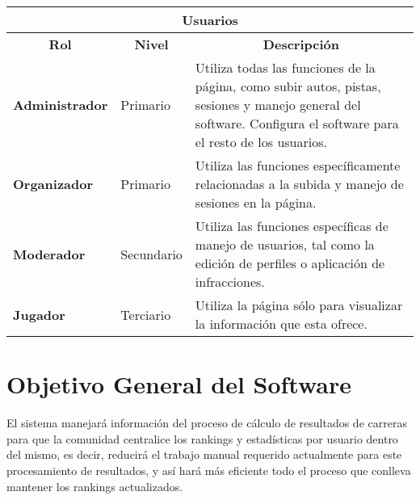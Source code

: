 \begin{center}
	\begin{tabular}{| p{3cm} | p{3cm} | p{10cm} |}
		\hline
		\multicolumn{3}{|c|}{\textbf{Usuarios}} \\
		\hline
		\multicolumn{1}{|c|}{\textbf{Rol}} & \multicolumn{1}{|c|}{\textbf{Nivel}} & \multicolumn{1}{|c|}{\textbf{Descripción}} \\
		\hline
		{\textbf{Administrador}} & Primario & Utiliza todas las funciones de la página, como subir autos, pistas, sesiones y manejo general del software. Configura el software para el resto de los usuarios.\\ \hline
		{\textbf{Organizador}} & Primario & Utiliza las funciones específicamente relacionadas a la subida y manejo de sesiones en la página.\\ \hline
		{\textbf{Moderador}} & Secundario & Utiliza las funciones específicas de manejo de usuarios, tal como la edición de perfiles o aplicación de infracciones. \\ \hline
		{\textbf{Jugador}} & Terciario & Utiliza la página sólo para visualizar la información que esta ofrece. \\ \hline
	\end{tabular}
\end{center}

\section{Objetivo General del Software}
El sistema manejará información del proceso de cálculo de resultados de carreras para que la comunidad centralice los rankings y estadísticas por usuario dentro del mismo, es decir, reducirá el trabajo manual requerido actualmente para este procesamiento de resultados, y así hará más eficiente todo el proceso que conlleva mantener los rankings actualizados.

